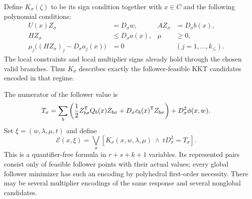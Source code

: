 Define $K_\sigma(\zeta)$ to be its sign condition together with $x\in C$
and the following polynomial conditions:
\begin{align}
 U(x)Z_\sigma&=D_\sigma w,& AZ_\sigma&=D_\sigma b(x),
 \label{eq:compressed-primal}\\
 HZ_\sigma&\le D_\sigma a(x),&\mu&\ge0,\nonumber\\
 \mu_j\bigl((HZ_\sigma)_j-D_\sigma a_j(x)\bigr)&=0
 &&(j=1,\ldots,k_{\le}).\nonumber
\end{align}
The local constraints and local multiplier signs already hold through
the chosen valid branches. Thus $K_\sigma$ describes exactly the
follower-feasible KKT candidates encoded in that regime.

The numerator of the follower value is
\begin{equation}\label{eq:candidate-value-numerator}
 T_\sigma=\sum_b\left(\frac12 Z_{b\sigma}^{\mathsf T} Q_b(x)Z_{b\sigma}
                 +D_\sigma c_b(x)^{\mathsf T} Z_{b\sigma}\right)
                       +D_\sigma^2\phi(x,w).
\end{equation}
Set $\xi=(w,\lambda,\mu,t)$ and define
\begin{equation}\label{eq:candidate-formula}
 \mathcal E(x,\xi)=\bigvee_\sigma
       \left[K_\sigma(x,w,\lambda,\mu)\ \wedge\
                         tD_\sigma^2=T_\sigma\right].
\end{equation}
This is a quantifier-free formula in $r+s+k+1$ variables. Its represented
pairs consist only of feasible follower points with their actual values;
every global follower minimizer has such an encoding by polyhedral
first-order necessity. There may be several multiplier encodings of the
same response and several nonglobal candidates.

